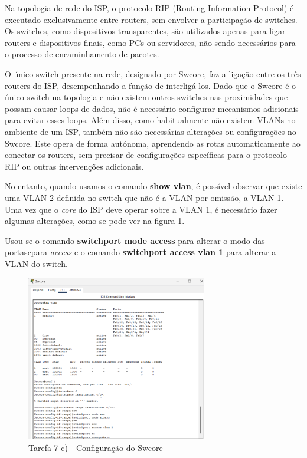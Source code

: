 \documentclass[11pt,english, openright, oneside]{book}
\begin{document}
Na topologia de rede do ISP, o protocolo RIP (Routing Information Protocol) é executado exclusivamente entre routers, sem envolver a participação de switches. Os switches, como dispositivos transparentes, são utilizados apenas para ligar routers e dispositivos finais, como PCs ou servidores, não sendo necessários para o processo de encaminhamento de pacotes.

\par O único switch presente na rede, designado por Swcore, faz a ligação entre os três routers do ISP, desempenhando a função de interligá-los. Dado que o Swcore é o único switch na topologia e não existem outros switches nas proximidades que possam causar loops de dados, não é necessário configurar mecanismos adicionais para evitar esses loops. Além disso, como habitualmente não existem VLANs no ambiente de um ISP, também não são necessárias alterações ou configurações no Swcore. Este opera de forma autónoma, aprendendo as rotas automaticamente ao conectar os routers, sem precisar de configurações específicas para o protocolo RIP ou outras intervenções adicionais.

\par No entanto, quando usamos o comando \textbf{show vlan}, é possível observar que existe uma VLAN 2 definida no switch que não é a VLAN por omissão, a VLAN 1. Uma vez que o \textit{core} do ISP deve operar sobre a VLAN 1, é necessário fazer algumas alterações, como se pode ver na figura \ref{fig:7.c}.
\par Usou-se o comando \textbf{switchport mode access} para alterar o modo das portascpara \textit{access} e o comando \textbf{switchport access vlan 1} para alterar a VLAN do switch.
\vspace{0.4cm}

\begin{figure}[H]
    \centering
    \includegraphics[width=0.7\textwidth]{imagens/Tarefa7/7.c.png}
    \caption{Tarefa 7 c) - Configuração do Swcore}
    \label{fig:7.c}
\end{figure}
\end{document}

